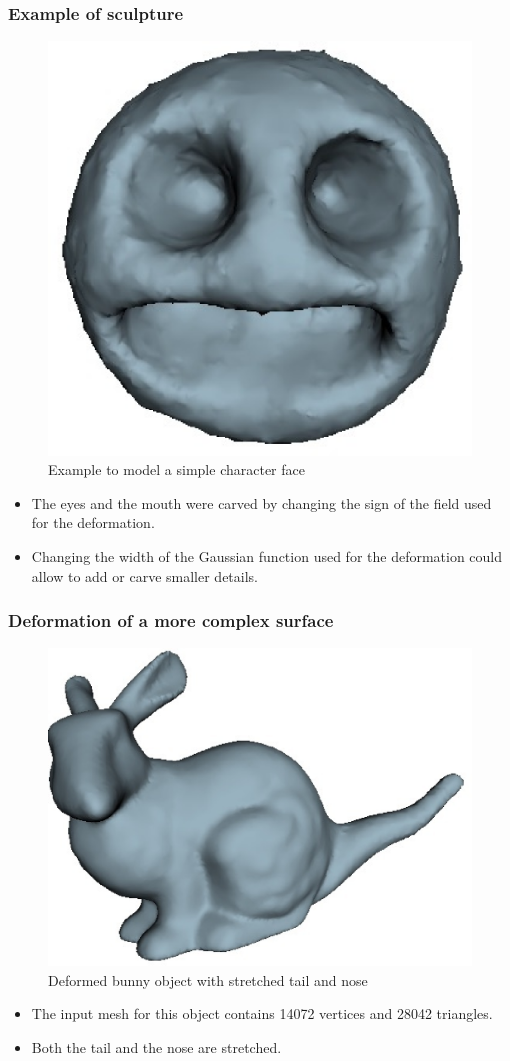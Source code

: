 \documentclass{beamer}
\begin{document}
\begin{frame}
\frametitle{Example of sculpture}
\Large
\begin{figure}
  \centering\includegraphics[width=0.3\columnwidth]{simplefacepoisson2.eps}
  \caption{Example to model a simple character face} \label{fig:face}
\end{figure}
\begin{itemize}
\item The eyes and the mouth were carved by changing the sign of the field used for the deformation.
\item Changing the width of the Gaussian function used for the deformation could allow to add or carve smaller details.
\end{itemize}
\end{frame}

\begin{frame}
\frametitle{Deformation of a more complex surface}
\begin{figure}
  \centering\includegraphics[width=0.4\columnwidth]{deformedbunnypoisson.eps}
  \caption{Deformed bunny object with stretched tail and nose} \label{fig:bunnyPoisson}
\end{figure}

\Large
\begin{itemize}
\item The input mesh for this object contains 14072 vertices and 28042 triangles.
\item  Both the tail and the nose are stretched.
\end{itemize}


\end{frame}
\end{document}
